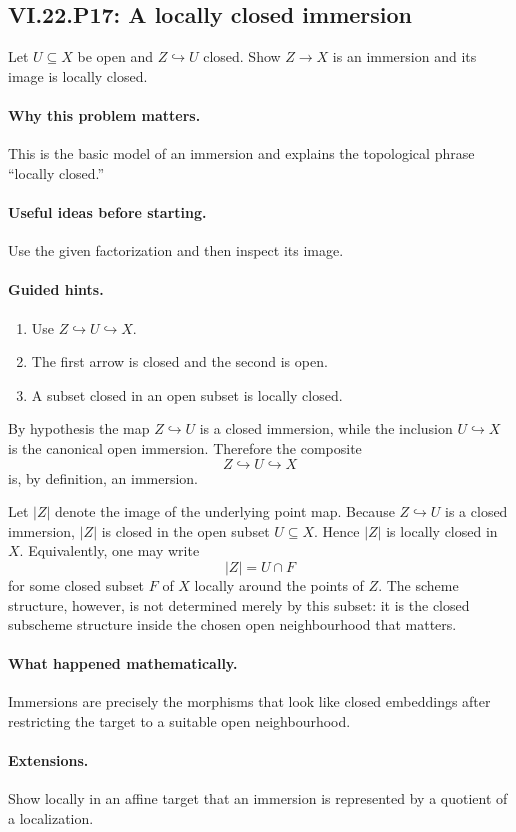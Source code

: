 \subsection*{VI.22.P17: A locally closed immersion}
\begin{problem}\label{prob:vi22-p17}
Let $U\subseteq X$ be open and $Z\hookrightarrow U$ closed.  Show $Z\to X$ is an immersion and its image is locally closed.
\end{problem}

\ifdefined\FullProblemDossiers
\paragraph{Why this problem matters.}
This is the basic model of an immersion and explains the topological phrase ``locally closed.''

\paragraph{Useful ideas before starting.}
Use the given factorization and then inspect its image.

\paragraph{Guided hints.}
\begin{enumerate}
\item Use $Z\hookrightarrow U\hookrightarrow X$.
\item The first arrow is closed and the second is open.
\item A subset closed in an open subset is locally closed.
\end{enumerate}

\begin{solution}
By hypothesis the map $Z\hookrightarrow U$ is a closed immersion, while the
inclusion $U\hookrightarrow X$ is the canonical open immersion.  Therefore the composite
\[
 Z\hookrightarrow U\hookrightarrow X
\]
is, by definition, an immersion.

Let $|Z|$ denote the image of the underlying point map.  Because $Z\hookrightarrow U$ is a
closed immersion, $|Z|$ is closed in the open subset $U\subseteq X$.  Hence $|Z|$ is locally
closed in $X$.  Equivalently, one may write
\[
 |Z|=U\cap F
\]
for some closed subset $F$ of $X$ locally around the points of $Z$.  The scheme structure,
however, is not determined merely by this subset: it is the closed subscheme structure inside
the chosen open neighbourhood that matters.
\end{solution}

\paragraph{What happened mathematically.}
Immersions are precisely the morphisms that look like closed embeddings after restricting the target to a suitable open neighbourhood.

\paragraph{Extensions.}
Show locally in an affine target that an immersion is represented by a quotient of a localization.
\fi
